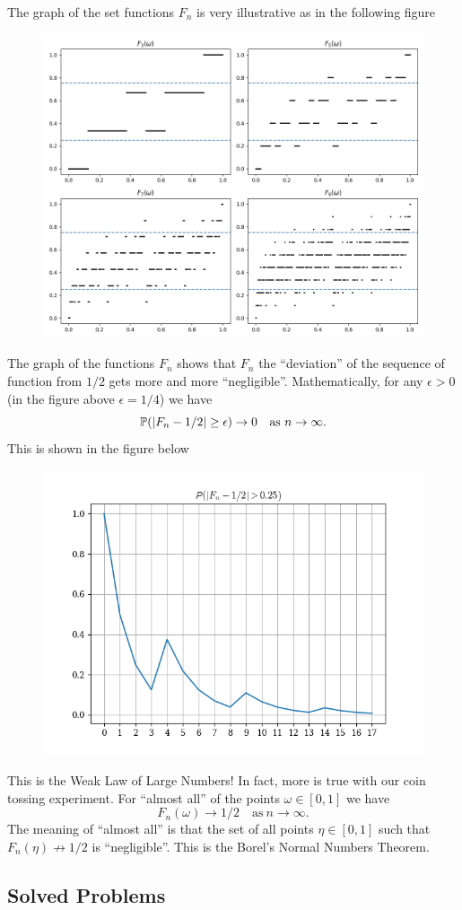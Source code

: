 The graph of the set functions $ F_n $ is very illustrative as in the following figure
\begin{figure}[h!]
	\centering
	\includegraphics[width=0.6\linewidth]{Images/FractionRandomVariable}
	\label{fig:fractionrandomvariable}
\end{figure}
\FloatBarrier
The graph of the functions $ F_n $ shows that $ F_n $ the ``deviation'' of the sequence of function from $ 1/2 $ gets more and more ``negligible''. Mathematically, for any $ \epsilon>0 $ (in the figure above $ \epsilon=1/4 $) we have
\[ \mathbb{P}(|F_n - 1/2|\geq \epsilon)\to 0 \quad \text{as } n\to\infty. \]
This is shown in the figure below
\begin{figure}[h!]
	\centering
	\includegraphics[width=0.5\linewidth]{Images/convergenceInProb}
	\label{fig:convergenceinprob}
\end{figure}
\FloatBarrier
This is the Weak Law of Large Numbers! In fact, more is true with our coin tossing experiment. For ``almost all'' of the points $ \omega \in [0,1] $ we have
\[ F_n(\omega) \to 1/2 \quad \text{as}\ n\to\infty. \]
The meaning of ``almost all'' is that the set of all points $ \eta \in [0,1] $ such that $ F_n(\eta)\not\to 1/2 $ is ``negligible''. This is the Borel's Normal Numbers Theorem.






\subsection{Solved Problems}

